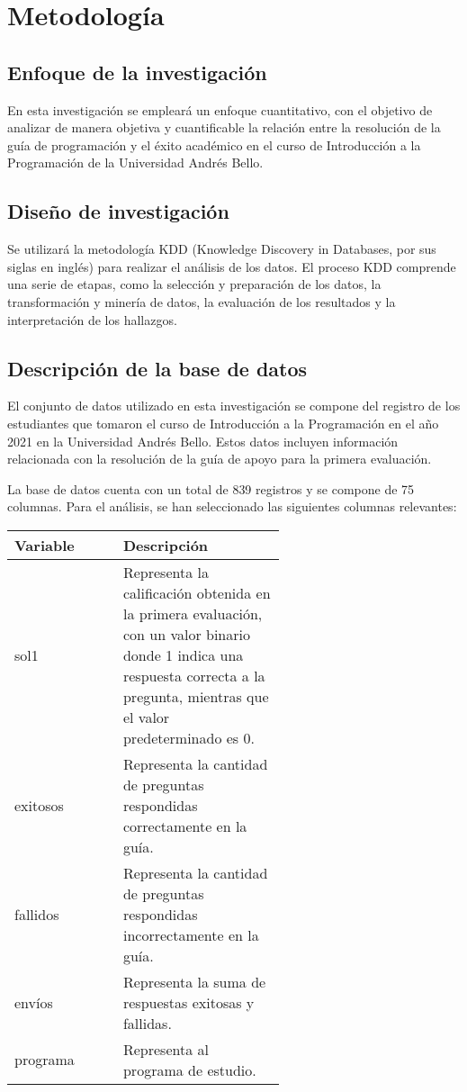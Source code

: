 \hypertarget{metodología}{%
    \section{Metodología}\label{Metodología}}
\vfill
\subsection*{Enfoque de la investigación}

En esta investigación se empleará un enfoque cuantitativo, con el objetivo de analizar de manera objetiva y cuantificable
la relación entre la resolución de la guía de programación y el éxito académico en el curso de Introducción a la
Programación de la Universidad Andrés Bello.
\vfill
\subsection*{Diseño de investigación}

Se utilizará la metodología KDD (Knowledge Discovery in Databases, por sus siglas en inglés) para realizar el análisis de los datos.
El proceso KDD comprende una serie de etapas, como la selección y preparación de los datos, la transformación y minería de datos,
la evaluación de los resultados y la interpretación de los hallazgos.

\vfill
\subsection*{Descripción de la base de datos}

El conjunto de datos utilizado en esta investigación se compone del registro de los estudiantes que tomaron el curso de
Introducción a la Programación en el año 2021 en la Universidad Andrés Bello. Estos datos incluyen información relacionada con la
resolución de la guía de apoyo para la primera evaluación.

La base de datos cuenta con un total de 839 registros y se compone de 75 columnas. Para el análisis,
se han seleccionado las siguientes columnas relevantes:

\begin{center}
    \begin{tabular}{|l|p{0.6\linewidth}|}
      \hline
      \textbf{Variable} & \textbf{Descripción} \\
      \hline
      sol1 & Representa la calificación obtenida en la primera evaluación, con un valor binario donde 1 indica una respuesta correcta a la pregunta, mientras que el valor predeterminado es 0. \\
      \hline
      exitosos & Representa la cantidad de preguntas respondidas correctamente en la guía. \\
      \hline
      fallidos & Representa la cantidad de preguntas respondidas incorrectamente en la guía. \\
      \hline
      envíos & Representa la suma de respuestas exitosas y fallidas. \\
      \hline
      programa & Representa al programa de estudio. \\
      \hline
    \end{tabular}
  \end{center}

